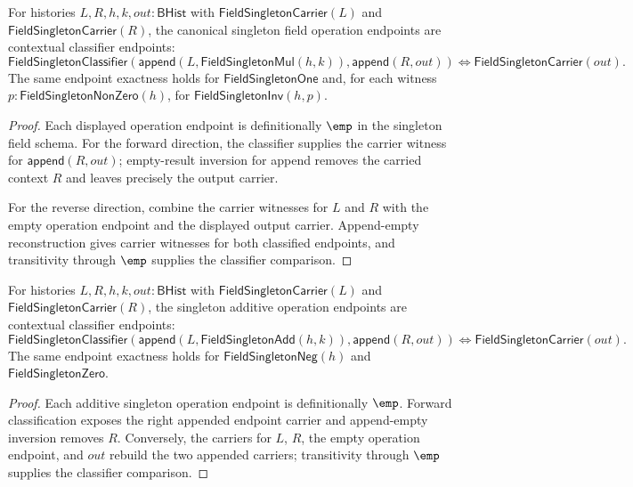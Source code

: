 \begin{theorem}
\label{thm:field-singleton-classifier-operation-context-endpoint-package}
For histories $L,R,h,k,out:\mathsf{BHist}$ with
$\mathsf{FieldSingletonCarrier}(L)$ and $\mathsf{FieldSingletonCarrier}(R)$,
the canonical singleton field operation endpoints are contextual classifier
endpoints:
$$
\mathsf{FieldSingletonClassifier}
  (\mathsf{append}(L,\mathsf{FieldSingletonMul}(h,k)),\mathsf{append}(R,out))
\Longleftrightarrow
\mathsf{FieldSingletonCarrier}(out).
$$
The same endpoint exactness holds for $\mathsf{FieldSingletonOne}$ and, for
each witness $p:\mathsf{FieldSingletonNonZero}(h)$, for
$\mathsf{FieldSingletonInv}(h,p)$.
\end{theorem}
\begin{proof}
Each displayed operation endpoint is definitionally $\emp$ in the singleton
field schema. For the forward direction, the classifier supplies the carrier
witness for $\mathsf{append}(R,out)$; empty-result inversion for append removes
the carried context $R$ and leaves precisely the output carrier.

For the reverse direction, combine the carrier witnesses for $L$ and $R$ with
the empty operation endpoint and the displayed output carrier. Append-empty
reconstruction gives carrier witnesses for both classified endpoints, and
transitivity through $\emp$ supplies the classifier comparison.
\end{proof}

\begin{theorem}
\label{thm:field-singleton-add-neg-zero-operation-context-endpoint-package}
For histories $L,R,h,k,out:\mathsf{BHist}$ with
$\mathsf{FieldSingletonCarrier}(L)$ and $\mathsf{FieldSingletonCarrier}(R)$,
the singleton additive operation endpoints are contextual classifier endpoints:
$$
\mathsf{FieldSingletonClassifier}
  (\mathsf{append}(L,\mathsf{FieldSingletonAdd}(h,k)),\mathsf{append}(R,out))
\Longleftrightarrow
\mathsf{FieldSingletonCarrier}(out).
$$
The same endpoint exactness holds for $\mathsf{FieldSingletonNeg}(h)$ and
$\mathsf{FieldSingletonZero}$.
\end{theorem}
\begin{proof}
Each additive singleton operation endpoint is definitionally $\emp$. Forward
classification exposes the right appended endpoint carrier and append-empty
inversion removes $R$. Conversely, the carriers for $L$, $R$, the empty
operation endpoint, and $out$ rebuild the two appended carriers; transitivity
through $\emp$ supplies the classifier comparison.
\end{proof}

